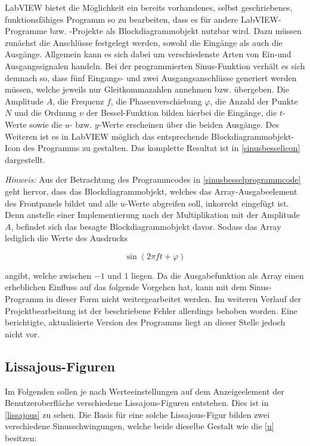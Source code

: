 \documentclass[
a4paper,
12pt,
pagesize,
ngerman
]{scrartcl}
\begin{document}
	\noindent LabVIEW bietet die Möglichkeit ein bereits vorhandenes, selbst geschriebenes, funktionsfähiges Programm so zu bearbeiten, dass es für andere LabVIEW-Programme bzw. -Projekte als Blockdiagrammobjekt nutzbar wird. Dazu müssen zunächst die Anschlüsse festgelegt werden, sowohl die Eingänge als auch die Ausgänge. Allgemein kann es sich dabei um verschiedenste Arten von Ein-und Ausgangssignalen handeln. Bei der programmierten Sinus-Funktion verhält es sich demnach so, dass fünf Eingangs- und zwei Ausgangsanschlüsse generiert werden müssen, welche jeweils nur Gleitkommazahlen annehmen bzw. übergeben. Die Amplitude $A$, die Frequenz $f$, die Phasenverschiebung $\varphi$, die Anzahl der Punkte $N$ und die Ordnung $\nu$ der Bessel-Funktion bilden hierbei die Eingänge, die $t$-Werte sowie die $u$- bzw. $y$-Werte erscheinen über die beiden Ausgänge. Des Weiteren ist es in LabVIEW möglich das entsprechende Blockdiagrammobjekt-Icon des Programms zu gestalten. Das komplette Resultat ist in \cref{sinusbesselicon} dargestellt.
	
	\emph{Hinweis:} Aus der Betrachtung des Programmcodes in \cref{sinusbesselprogrammcode} geht hervor, dass das Blockdiagrammobjekt, welches das Array-Ausgabeelement des Frontpanels bildet und alle $u$-Werte abgreifen soll, inkorrekt eingefügt ist. Denn anstelle einer Implementierung nach der Multiplikation mit der Amplitude $A$, befindet sich das besagte Blockdiagrammobjekt davor. Sodass das Array lediglich die Werte des Ausdrucks
	
	\begin{equation}
	\sin(2\pi f t + \varphi)
	\end{equation}
	
	\noindent angibt, welche zwischen $-1$ und $1$ liegen. Da die Ausgabefunktion als Array einen erheblichen Einfluss auf das folgende Vorgehen hat, kann mit dem Sinus-Programm in dieser Form nicht weitergearbeitet werden. Im weiteren Verlauf der Projektbearbeitung ist der beschriebene Fehler allerdings behoben worden. Eine berichtigte, aktualisierte Version des Programms liegt an dieser Stelle jedoch nicht vor.
	\label{sinus_amp_fehler}
	
	\subsection{Lissajous-Figuren}
	
	Im Folgenden sollen je nach Werteeinstellungen auf dem Anzeigeelement der Benutzeroberfläche verschiedene Lissajous-Figuren entstehen. Dies ist in \cref{lissajous} zu sehen. Die Basis für eine solche Lissajous-Figur bilden zwei verschiedene Sinusschwingungen, welche beide dieselbe Gestalt wie die \cref{u} besitzen:
	
\end{document}
